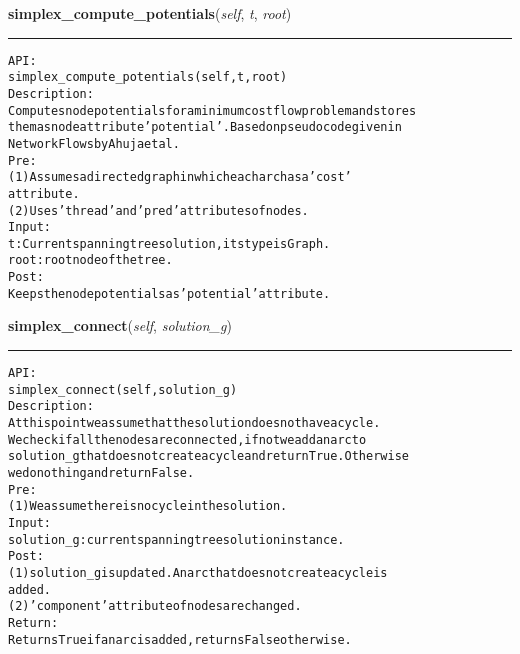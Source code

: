    \vspace{0.5ex}

\hspace{.8\funcindent}\begin{boxedminipage}{\funcwidth}

    \raggedright \textbf{simplex\_compute\_potentials}(\textit{self}, \textit{t}, \textit{root})

    \vspace{-1.5ex}

    \rule{\textwidth}{0.5\fboxrule}
\setlength{\parskip}{2ex}
\begin{alltt}

API:
    simplex\_compute\_potentials(self, t, root)
Description:
    Computes node potentials for a minimum cost flow problem and stores
    them as node attribute 'potential'. Based on pseudocode given in
    Network Flows by Ahuja et al.
Pre:
    (1) Assumes a directed graph in which each arc has a 'cost'
    attribute.
    (2) Uses 'thread' and 'pred' attributes of nodes.
Input:
    t: Current spanning tree solution, its type is Graph.
    root: root node of the tree.
Post:
    Keeps the node potentials as 'potential' attribute.
\end{alltt}

\setlength{\parskip}{1ex}
    \end{boxedminipage}

    \label{coinor:gimpy:graph:Graph:simplex_connect}

    \vspace{0.5ex}

\hspace{.8\funcindent}\begin{boxedminipage}{\funcwidth}

    \raggedright \textbf{simplex\_connect}(\textit{self}, \textit{solution\_g})

    \vspace{-1.5ex}

    \rule{\textwidth}{0.5\fboxrule}
\setlength{\parskip}{2ex}
\begin{alltt}

API:
    simplex\_connect(self, solution\_g)
Description:
    At this point we assume that the solution does not have a cycle.
    We check if all the nodes are connected, if not we add an arc to
    solution\_g that does not create a cycle and return True. Otherwise
    we do nothing and return False.
Pre:
    (1) We assume there is no cycle in the solution.
Input:
    solution\_g: current spanning tree solution instance.
Post:
    (1) solution\_g is updated. An arc that does not create a cycle is
    added.
    (2) 'component' attribute of nodes are changed.
Return:
    Returns True if an arc is added, returns False otherwise.
\end{alltt}

\setlength{\parskip}{1ex}
    \end{boxedminipage}

